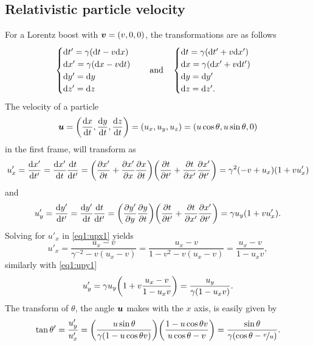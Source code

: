 \documentclass[11pt,a4paper, 
swedish, english %
]{article}
\begin{document}
\subsection{Relativistic particle velocity}
For a Lorentz boost with $\vb*v=(v,0,0)$, the transformations are as
follows
\begin{equation}
\begin{cases}
\rd{t}'=\gamma(\rd{t}-v\rd{x})\\
\rd{x}'=\gamma(\rd{x}-v\rd{t})\\
\rd{y}'=\rd{y}\\
\rd{z}'=\rd{z}
\end{cases}
\qand
\begin{cases}
\rd{t}=\gamma(\rd{t}'+v\rd{x}')\\
\rd{x}=\gamma(\rd{x}'+v\rd{t}')\\
\rd{y}=\rd{y}'\\
\rd{z}=\rd{z}'.
\end{cases}
\end{equation}
The velocity of a particle 
\begin{equation}
\vb*u=\qty(\dv{x}{t},\dv{y}{t},\dv{z}{t})
=(u_x,u_y,u_z)=(u\cos\theta,u\sin\theta,0)
\end{equation}
in the first frame, will transform as
\begin{equation}\label{eq1:upx1}
u'_x=\dv{x'}{t'}=\dv{x'}{t}\dv{t}{t'}
=\qty(\pdv{x'}{t}+\pdv{x'}{x}\pdv{x}{t})
\qty(\pdv{t}{t'}+\pdv{t}{x'}\pdv{x'}{t'})
=\gamma^2(-v+u_x)(1+vu'_x)
\end{equation}
and
\begin{equation}\label{eq1:upy1}
u'_y=\dv{y'}{t'}=\dv{y'}{t}\dv{t}{t'}
=\qty(\pdv{y'}{y}\pdv{y}{t})
\qty(\pdv{t}{t'}+\pdv{t}{x'}\pdv{x'}{t'})
=\gamma u_y(1+vu'_x).
\end{equation}
Solving for $u'_x$ in \eqref{eq1:upx1} yields
\begin{equation}
u'_x=\frac{u_x-v}{\gamma^{-2}-v(u_x-v)}
=\frac{u_x-v}{1-v^2-v(u_x-v)}
=\frac{u_x-v}{1-u_x v},
\end{equation}
similarly with \eqref{eq1:upy1}
\begin{equation}
u'_y=\gamma u_y\qty(1+v\frac{u_x-v}{1-u_x v})
=\frac{u_y}{\gamma(1-u_x v)}.
\end{equation}
The transform of $\theta$, the angle $\vb*u$ makes with the $x$ axis,
is easily given by 
\begin{equation}
\tan\theta'=\frac{u_y'}{u_x'}
=\qty(\frac{u\sin\theta}{\gamma(1-u\cos\theta v)})
\qty(\frac{1-u\cos\theta v}{u\cos\theta-v})
=\frac{\sin\theta}{\gamma(\cos\theta-\nicefrac{v}{u})}.
\end{equation}
\end{document}
